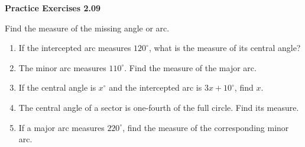 \vspace{0.3ex}
\noindent\textbf{Practice Exercises 2.09}

\vspace{0.2ex}

Find the measure of the missing angle or arc.

\begin{enumerate}
    \item If the intercepted arc measures $120^\circ$, what is the measure of its central angle?
    \item The minor arc measures $110^\circ$. Find the measure of the major arc.
    \item If the central angle is $x^\circ$ and the intercepted arc is $3x + 10^\circ$, find $x$.
    \item The central angle of a sector is one-fourth of the full circle. Find its measure.
    \item If a major arc measures $220^\circ$, find the measure of the corresponding minor arc.
\end{enumerate}
